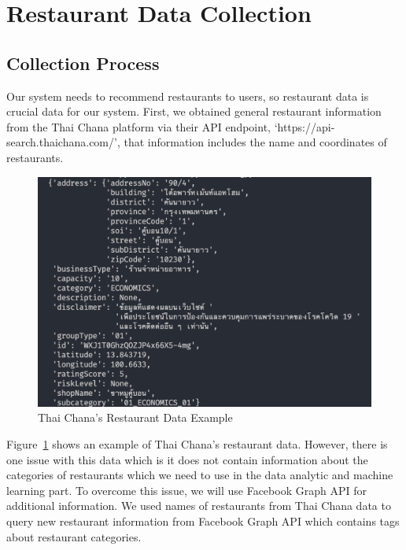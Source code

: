 \documentclass[12pt,oneside,openright,a4paper]{cpe-english-project}
\begin{document}
\section{Restaurant Data Collection}

\subsection{Collection Process}


Our system needs to recommend restaurants to users, so restaurant data is crucial data for our system. First, we obtained general restaurant information from the Thai Chana platform via their API endpoint, ‘https://api-search.thaichana.com/’, that information includes the name and coordinates of restaurants.

\begin{figure}[H]\centering
\includegraphics[width=400pt]{./images/4ThaiChanasRestaurantDataExample.png}
\caption{Thai Chana’s Restaurant Data Example}\label{fig:4ThaiChanasRestaurantDataExample}
\end{figure}\vspace{-24pt}

Figure~\ref{fig:4ThaiChanasRestaurantDataExample} shows an example of Thai Chana’s restaurant data. However, there is one issue with this data which is it does not contain information about the categories of restaurants which we need to use in the data analytic and machine learning part. To overcome this issue, we will use Facebook Graph API for additional information. We used names of restaurants from Thai Chana data to query new restaurant information from Facebook Graph API which contains tags about restaurant categories.
\end{document}
